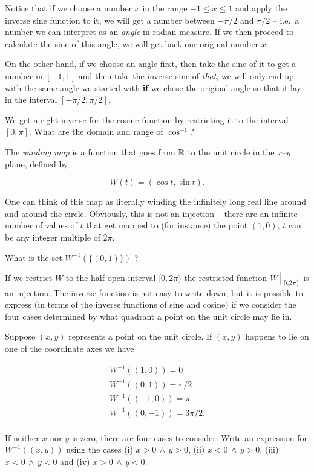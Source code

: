 Notice that if we choose a number $x$ in the range $-1 \leq x \leq 1$ and apply
the inverse sine function to it, we will get a number between $-\pi/2$ and 
$\pi/2$ -- i.e.\ a number we can interpret as an \emph{angle} in radian measure.
If we then proceed to calculate the sine of this angle, we will get back our
original number $x$.

On the other hand, if we choose an angle first, then take the sine of it to
get a number in $[-1,1]$ and then take the inverse sine of \emph{that},
we will only end up with the same angle we started with {\bf if} 
we chose the original angle
so that it lay in the interval $[-\pi/2, \pi/2]$.

\begin{exer}
We get a right inverse for the cosine function by restricting it to
the interval $[0,\pi]$.  What are the domain and range of $\cos^{-1}$?
\end{exer} 

The \emph{winding map} is a function that goes 
from ${\mathbb R}$ to the unit circle in the $x$--$y$ plane, defined by

\[ W(t) = (\cos{t}, \sin{t}). \]

One can think of this map as literally winding the infinitely long
real line around and around the circle.   Obviously, this is not an
injection -- there are an infinite number of values of $t$ that 
get mapped to (for instance) the point $(1,0)$, $t$ can be any integer
multiple of $2\pi$.

\begin{exer}
What is the set $W^{-1}(\{(0,1)\})$ ?
\end{exer}

If we restrict $W$ to the half-open interval $[0, 2\pi)$ the restricted
function $\restrict{W}{[0, 2\pi)}$ is an injection.  The inverse function is 
not easy to write down, but it is possible to express (in terms 
of the inverse functions of sine and cosine) if we consider the 
four cases determined by what quadrant a point on the unit circle 
may lie in.

\begin{exer}
Suppose $(x,y)$ represents a point on the unit circle.  If $(x,y)$ happens
to lie on one of the coordinate axes we have 

\begin{gather*}
W^{-1}((1,0)) = 0\\
W^{-1}((0,1)) = \pi/2\\
W^{-1}((-1,0)) = \pi\\
W^{-1}((0,-1)) = 3\pi/2.\\
\end{gather*}

If neither $x$ nor $y$ is zero, there are four cases to consider.
Write an expression for $W^{-1}((x,y))$ using the cases 
(i) $x>0 \, \land \, y>0$, 
(ii) $x<0 \, \land \, y>0$, 
(iii) $x<0 \, \land \, y<0$ and  
(iv) $x>0 \, \land \, y<0$. 

\end{exer}


